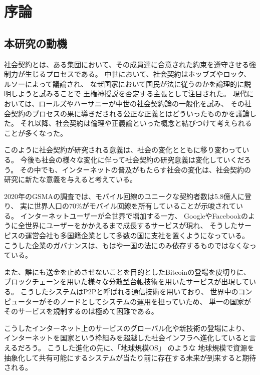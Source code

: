 \chapter{序論}
  \section{本研究の動機}
  社会契約とは、ある集団において、その成員達に合意された約束を遵守させる強制力が生じるプロセスである。
  中世において、社会契約はホッブズやロック、ルソーによって議論され、
  なぜ国家において国民が法に従うのかを論理的に説明しようと試みることで
  王権神授説を否定する主張として注目された。
  現代においては、ロールズやハーサニーが中世の社会契約論の一般化を試み、
  その社会契約のプロセスの果に導きだされる公正な正義とはどういったものかを議論した。
  それ以降、社会契約は倫理や正義論といった概念と結びつけて考えられることが多くなった。
  
  このように社会契約が研究される意義は、社会の変化とともに移り変わっている。
  今後も社会の様々な変化に伴って社会契約の研究意義は変化していくだろう。
  その中でも、インターネットの普及がもたらす社会の変化は、社会契約の研究に新たな意義を与えると考えている。

  2020年のGSMA\cite{gsma2020}の調査では、モバイル回線のユニークな契約者数は5.8億人に登り、
  実に世界人口の70\%がモバイル回線を所有していることが示唆されている。
  インターネットユーザーが全世界で増加する一方、
  Google\cite{google}やFacebook\cite{facebook}のように全世界にユーザーをかかえるまで成長するサービスが現れ、
  そうしたサービスの運営会社も多国籍企業として多数の国に支社を置くようになっている。
  こうした企業のガバナンスは、もはや一国の法にのみ依存するものではなくなっている。

  また、誰にも送金を止めさせないことを目的としたBitcoin\cite{nakamoto2008bitcoin}の登場を皮切りに、
  ブロックチェーンを用いた様々な分散型台帳技術を用いたサービスが出現している。
  こうしたシステムはP2Pと呼ばれる通信技術を用いており、
  世界中のコンピューターがそのノードとしてシステムの運用を担っていため、
  単一の国家がそのサービスを規制するのは極めて困難である。
  
  こうしたインターネット上のサービスのグローバル化や新技術の登場により、
  インターネットを国家という枠組みを超越した社会インフラへ進化していると言えるだろう。
  こうした進化の先に、「地球規模OS」\cite{saito&ikemoto2008} のような
  地球規模で資源を抽象化して共有可能にするシステムが当たり前に存在する未来が到来すると期待される。

